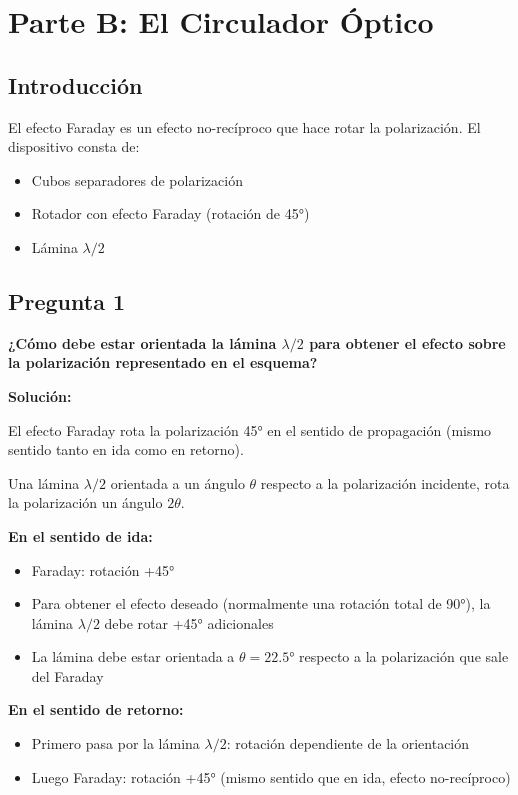 \documentclass[12pt,a4paper]{article}
\begin{document}
\section*{Parte B: El Circulador Óptico}

\subsection*{Introducción}
El efecto Faraday es un efecto no-recíproco que hace rotar la polarización. El dispositivo consta de:
\begin{itemize}
    \item Cubos separadores de polarización
    \item Rotador con efecto Faraday (rotación de 45°)
    \item Lámina $\lambda/2$
\end{itemize}

\subsection*{Pregunta 1}
\textbf{¿Cómo debe estar orientada la lámina $\lambda/2$ para obtener el efecto sobre la polarización representado en el esquema?}

\vspace{0.3cm}
\textbf{Solución:}

El efecto Faraday rota la polarización 45° en el sentido de propagación (mismo sentido tanto en ida como en retorno).

Una lámina $\lambda/2$ orientada a un ángulo $\theta$ respecto a la polarización incidente, rota la polarización un ángulo $2\theta$.

\textbf{En el sentido de ida:}
\begin{itemize}
    \item Faraday: rotación +45°
    \item Para obtener el efecto deseado (normalmente una rotación total de 90°), la lámina $\lambda/2$ debe rotar +45° adicionales
    \item La lámina debe estar orientada a $\theta = 22.5°$ respecto a la polarización que sale del Faraday
\end{itemize}

\textbf{En el sentido de retorno:}
\begin{itemize}
    \item Primero pasa por la lámina $\lambda/2$: rotación dependiente de la orientación
    \item Luego Faraday: rotación +45° (mismo sentido que en ida, efecto no-recíproco)
\end{itemize}
\end{document}
